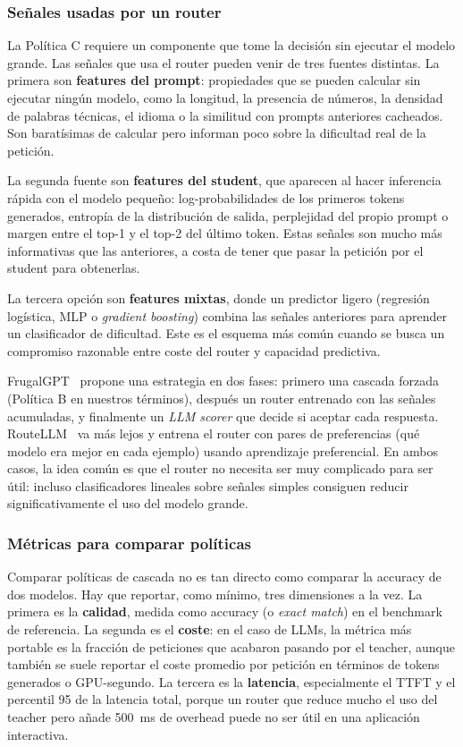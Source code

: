 \subsubsection{Señales usadas por un router}

La Política C requiere un componente que tome la decisión sin ejecutar el modelo grande. Las señales que usa el router pueden venir de tres fuentes distintas. La primera son \textbf{features del prompt}: propiedades que se pueden calcular sin ejecutar ningún modelo, como la longitud, la presencia de números, la densidad de palabras técnicas, el idioma o la similitud con prompts anteriores cacheados. Son baratísimas de calcular pero informan poco sobre la dificultad real de la petición.

La segunda fuente son \textbf{features del student}, que aparecen al hacer inferencia rápida con el modelo pequeño: log-probabilidades de los primeros tokens generados, entropía de la distribución de salida, perplejidad del propio prompt o margen entre el top-1 y el top-2 del último token. Estas señales son mucho más informativas que las anteriores, a costa de tener que pasar la petición por el student para obtenerlas.

La tercera opción son \textbf{features mixtas}, donde un predictor ligero (regresión logística, MLP o \textit{gradient boosting}) combina las señales anteriores para aprender un clasificador de dificultad. Este es el esquema más común cuando se busca un compromiso razonable entre coste del router y capacidad predictiva.

FrugalGPT~\cite{chen2023frugalgpt} propone una estrategia en dos fases: primero una cascada forzada (Política B en nuestros términos), después un router entrenado con las señales acumuladas, y finalmente un \textit{LLM scorer} que decide si aceptar cada respuesta. RouteLLM~\cite{dekoninck2024routing} va más lejos y entrena el router con pares de preferencias (qué modelo era mejor en cada ejemplo) usando aprendizaje preferencial. En ambos casos, la idea común es que el router no necesita ser muy complicado para ser útil: incluso clasificadores lineales sobre señales simples consiguen reducir significativamente el uso del modelo grande.

\subsubsection{Métricas para comparar políticas}

Comparar políticas de cascada no es tan directo como comparar la accuracy de dos modelos. Hay que reportar, como mínimo, tres dimensiones a la vez. La primera es la \textbf{calidad}, medida como accuracy (o \textit{exact match}) en el benchmark de referencia. La segunda es el \textbf{coste}: en el caso de LLMs, la métrica más portable es la fracción de peticiones que acabaron pasando por el teacher, aunque también se suele reportar el coste promedio por petición en términos de tokens generados o GPU-segundo. La tercera es la \textbf{latencia}, especialmente el TTFT y el percentil 95 de la latencia total, porque un router que reduce mucho el uso del teacher pero añade 500~ms de overhead puede no ser útil en una aplicación interactiva.

